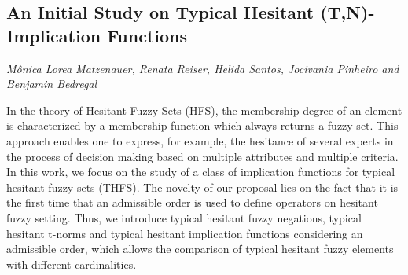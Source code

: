 \documentclass[../booklet.tex]{subfiles}
\begin{document}
\subsection[An Initial Study on Typical Hesitant (T,N)-Implication Functions. {\it Mônica Lorea Matzenauer, Renata Reiser, Helida Santos, Jocivania Pinheiro and Benjamin Bedregal}]{An Initial Study on Typical Hesitant (T,N)-Implication Functions}
    

\begin{center}
  {\it Mônica Lorea Matzenauer, Renata Reiser, Helida Santos, Jocivania Pinheiro and Benjamin Bedregal}
\end{center}



In the theory of Hesitant Fuzzy Sets (HFS), the membership degree of an element is characterized by a membership function which always returns a fuzzy set. This approach enables one to express, for example, the hesitance of several experts in the process of decision making based on multiple attributes and multiple criteria. In this work, we focus on the study of a class of implication functions for typical hesitant fuzzy sets (THFS). The novelty of our proposal lies on the fact that it is the first time that an admissible order is used to define operators on hesitant fuzzy setting. Thus, we introduce  typical hesitant fuzzy negations, typical hesitant t-norms and  typical hesitant implication functions considering an admissible order, which allows the comparison of typical hesitant fuzzy elements with different cardinalities.


\end{document}
